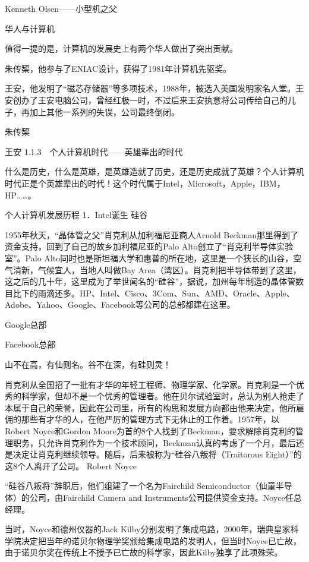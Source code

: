 \documentclass[12pt,UTF8]{ctexbook}
\begin{document}
Kenneth Olsen——小型机之父

华人与计算机

值得一提的是，计算机的发展史上有两个华人做出了突出贡献。

朱传榘，他参与了ENIAC设计，获得了1981年计算机先驱奖。

王安，他发明了“磁芯存储器”等多项技术，1988年，被选入美国发明家名人堂。王安创办了王安电脑公司，曾经红极一时，不过后来王安执意将公司传给自己的儿子，再加上其他一系列的失误，公司最终倒闭。

朱传榘

王安
1.1.3　个人计算机时代——英雄辈出的时代

什么是历史，什么是英雄，是英雄造就了历史，还是历史成就了英雄？个人计算机时代正是个英雄辈出的时代！这个时代属于Intel，Microsoft，Apple，IBM，HP……。

个人计算机发展历程
1．Intel诞生
硅谷

1955年秋天，“晶体管之父”肖克利从加利福尼亚商人Arnold Beckman那里得到了资金支持，回到了自己的故乡加利福尼亚的Palo Alto创立了“肖克利半导体实验室”。Palo Alto同时也是斯坦福大学和惠普的所在地，这里是一个狭长的山谷，空气清新，气候宜人，当地人叫做Bay Area（湾区）。肖克利把半导体带到了这里，这之后的几十年，这里成为了举世闻名的“硅谷”，据说，加州每年制造的晶体管数目比下的雨滴还多。HP、Intel、Cisco、3Com、Sun、AMD、Oracle、Apple、Adobe、Yahoo、Google、Facebook等公司的总部都建在这里。

Google总部

Facebook总部

山不在高，有仙则名。谷不在深，有硅则灵！

肖克利从全国招了一批有才华的年轻工程师、物理学家、化学家。肖克利是一个优秀的科学家，但却不是一个优秀的管理者。他在贝尔试验室时，总认为别人抢走了本属于自己的荣誉，因此在公司里，所有的构思和发展方向都由他来决定，他所雇佣的那些有才华的人，在他严厉的管理方式下无休止的工作着。1957年，以Robert Noyce和Gordon Moore为首的8个人找到了Beckman，要求解除肖克利的管理职务，只允许肖克利作为一个技术顾问，Beckman认真的考虑了一个月，最后还是决定让肖克利继续领导。随后，后来被称为“硅谷八叛将（Traitorous Eight）”的这8个人离开了公司。
Robert Noyce

“硅谷八叛将”辞职后，他们组建了一个名为Fairchild Semiconductor（仙童半导体）的公司，由Fairchild Camera and Instruments公司提供资金支持。Noyce任总经理。

当时，Noyce和德州仪器的Jack Kilby分别发明了集成电路，2000年，瑞典皇家科学院决定把当年的诺贝尔物理学奖颁给集成电路的发明人，但当时Noyce已亡故，由于诺贝尔奖在传统上不授予已亡故的科学家，因此Kilby独享了此项殊荣。
\end{document}

